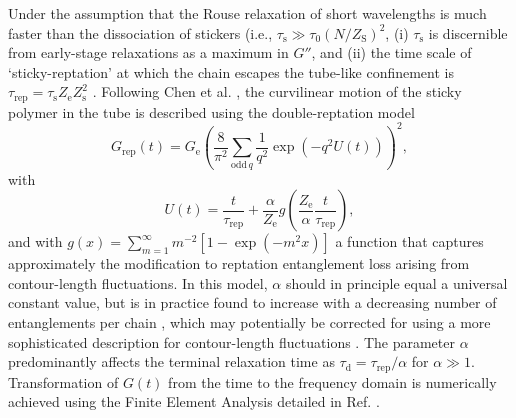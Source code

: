 \documentclass[  superscriptaddress]{revtex4}
\begin{document}
Under the assumption that the Rouse relaxation of short wavelengths is much faster than the dissociation of stickers (i.e., $\tau_\mathrm{s} \gg \tau_0 (N/Z_\mathrm{S})^2$, (i) $\tau_\mathrm{s}$ is discernible from early-stage relaxations as a maximum in $G''$, and (ii) the time scale of `sticky-reptation' at which the chain escapes the tube-like confinement is  $\tau_\mathrm{rep}=\tau_\mathrm{s}Z_\mathrm{e}Z_\mathrm{s}^{2}$ \cite{Leibler91}.
Following Chen et al. \cite{ChenQ16, ZhangZ18}, the curvilinear motion of the sticky polymer in the tube is described using the double-reptation model \cite{desCloizeaux88} 
\begin{equation}
  G_{\mathrm{rep}}(t) = G_\mathrm{e}\left(\frac{8}{\pi^2}\sum_{\mathrm{odd}\,q}\frac{1}{q^2}\exp(-q^2 U(t))\right)^2,
  \label{eq:DoubleReptation}
\end{equation}
with 
\begin{equation}
  U(t) = \frac{t}{\tau_\mathrm{rep}}+\frac{\alpha}{Z_\mathrm{e}}g\left( \frac{Z_\mathrm{e}}{\alpha}\frac{t}{ \tau_\mathrm{rep} } \right),
\end{equation}
and with $g(x)=\sum_{m=1}^{\infty}m^{-2}[1-\exp(-m^2 x)]$ a function that captures approximately the modification to reptation entanglement loss arising from contour-length fluctuations.
In this model, $\alpha$ should in principle equal a universal constant value, but is in practice found to increase with a decreasing number of entanglements per chain \cite{Ruymbeke02}, which may potentially be corrected for using a more sophisticated description for contour-length fluctuations \cite{Likhtman02}.
The parameter $\alpha$ predominantly affects the terminal relaxation time as $\tau_\mathrm{d}=\tau_\mathrm{rep}/\alpha$ for $\alpha \gg 1$. Transformation of $G(t)$ from the time to the frequency domain is numerically achieved using the Finite Element Analysis detailed in Ref. \cite{Nobile01}.



\end{document}
